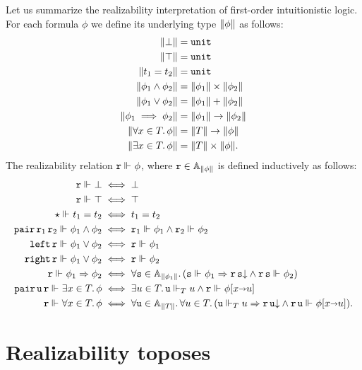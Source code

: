 Let us summarize the realizability interpretation of first-order
intuitionistic logic. For each formula $\phi$ we define its underlying
type $\T{\phi}$ as follows:
%
\begin{align*}
  \T{\bot} &= \unit \\
  \T{\top} &= \unit \\
  \T{t_1 = t_2} &= \unit \\
  \T{\phi_1 \land \phi_2} &= \T{\phi_1} \times \T{\phi_2}\\
  \T{\phi_1 \lor \phi_2} &= \T{\phi_1} + \T{\phi_2}\\
  \T{\phi_1 \implies \phi_2} &= \T{\phi_1} \to \T{\phi_2}\\
  \T{\all{x \in T}{\phi}} &= \T{T} \to \T{\phi} \\
  \T{\some{x \in T}{\phi}} &= \T{T} \times \T{\phi}.
\end{align*}
%
The realizability relation $\R{r} \rz \phi$, where $\R{r} \in
\Atyp{\T{\phi}}$ is defined inductively as follows:
%
\begin{align*}
  \R{r} \rz \bot &\iff \bot\\
  \R{r} \rz \top &\iff \top\\
  \ttunit \rz t_1 = t_2 &\iff t_1 = t_2\\
  \combPair\,\R{r}_1\,\R{r}_2 \rz \phi_1 \land \phi_2 &\iff
  \R{r}_1 \rz \phi_1 \land \R{r}_2 \rz \phi_2\\
  \combLeft\,\R{r} \rz \phi_1 \lor \phi_2 &\iff \R{r} \rz \phi_1\\
  \combRight\,\R{r} \rz \phi_1 \lor \phi_2 &\iff \R{r} \rz \phi_2\\
  \R{r} \rz \phi_1 \lthen \phi_2 &\iff
  \all{\R{s} \in \Atyp{\T{\phi_1}}} (\R{s} \rz \phi_1 \lthen
    \defined{\R{r}\,\R{s}} \land \R{r}\,\R{s} \rz \phi_2)
  \\
  \combPair\,\R{u}\,\R{r} \rz \some{x \in T}{\phi} &\iff
  \some{u \in T} \R{u} \rz[T] u \land \R{r} \rz \subst{\phi}{x \subto u}
  \\
  \R{r} \rz \all{x \in T}{\phi} &\iff
  \all{\R{u} \in \Atyp{\T{T}}}{
    \all{u \in T}
      (\R{u} \rz[T] u \lthen
      \defined{\R{r}\,\R{u}} \land \R{r}\,\R{u} \rz \subst{\phi}{x \subto u})
    }.
\end{align*}
%

\section{Realizability toposes}
\label{sec:realizability-toposes}


